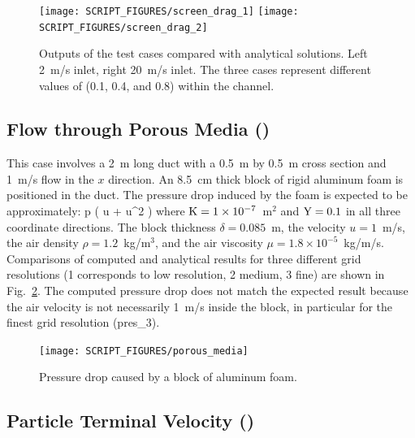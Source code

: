 \documentclass[11pt]{book}
\begin{document}
\begin{figure}[ht]
\texttt{[image: SCRIPT\_FIGURES/screen\_drag\_1]}
\texttt{[image: SCRIPT\_FIGURES/screen\_drag\_2]}
\caption[Sample cases ]{Outputs of the  test cases compared with analytical solutions.  Left 2~m/s inlet, right 20~m/s inlet.  The three cases represent different values of  (0.1, 0.4, and 0.8) within the channel.}
\label{screen_drag_plots}
\end{figure}

\subsection{Flow through Porous Media (\texorpdfstring{}{porous\_media})}
\label{porous_media}

This case involves a 2~m long duct with a 0.5~m by 0.5~m cross section and 1~m/s flow in the $x$ direction. An 8.5~cm thick block of rigid aluminum foam is positioned in the duct. The pressure drop induced by the foam is expected to be approximately:
\be
   \Delta p \approx \delta \left(  u \; + \; \rho {} u^2 \right)
\ee
where ${\rm K}=1 \times 10^{-7}$~m$^2$ and ${\rm Y}=0.1$ in all three coordinate directions. The block thickness $\delta=0.085$~m, the velocity $u=1$~m/s, the air density $\rho=1.2$~kg/m$^3$, and the air viscosity $\mu=1.8 \times 10^{-5}$~kg/m/s. Comparisons of computed and analytical results for three different grid resolutions (1 corresponds to low resolution, 2 medium, 3 fine) are shown in Fig.~\ref{porous_media_plot}. The computed pressure drop does not match the expected result because the air velocity is not necessarily 1~m/s inside the block, in particular for the finest grid resolution (pres\_3).

\begin{figure}[ht]
\centering
\texttt{[image: SCRIPT\_FIGURES/porous\_media]}
\caption[Results of the  test case]{Pressure drop caused by a block of aluminum foam.}
\label{porous_media_plot}
\end{figure}




\subsection{Particle Terminal Velocity (\texorpdfstring{}{terminal\_velocity})}
\end{document}
